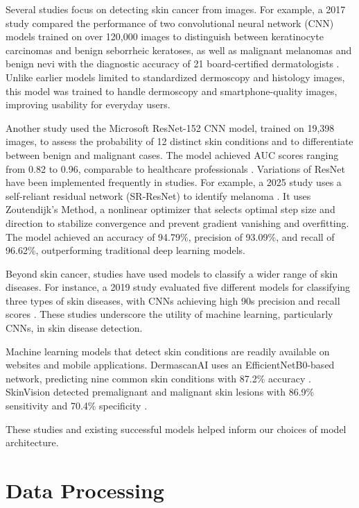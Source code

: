 \documentclass{article} %
\begin{document}
Several studies focus on detecting skin cancer from images. For example, a 2017 study compared the performance of two convolutional neural network (CNN) models trained on over 120,000 images to distinguish between keratinocyte carcinomas and benign seborrheic keratoses, as well as malignant melanomas and benign nevi with the diagnostic accuracy of 21 board-certified dermatologists \citep{esteva2017dermatologist}. Unlike earlier models limited to standardized dermoscopy and histology images, this model was trained to handle dermoscopy and smartphone-quality images, improving usability for everyday users.

Another study used the Microsoft ResNet-152 CNN model, trained on 19,398 images, to assess the probability of 12 distinct skin conditions and to differentiate between benign and malignant cases. The model achieved AUC scores ranging from 0.82 to 0.96, comparable to healthcare professionals \citep{han2018classification}. Variations of ResNet have been implemented frequently in studies. For example, a 2025 study uses a self-reliant residual network (SR-ResNet) to identify melanoma \citep{radhika2025self}. It uses Zoutendijk's Method, a nonlinear optimizer that selects optimal step size and direction to stabilize convergence and prevent gradient vanishing and overfitting. The model achieved an accuracy of 94.79\%, precision of 93.09\%, and recall of 96.62\%, outperforming traditional deep learning models.

Beyond skin cancer, studies have used models to classify a wider range of skin diseases. For instance, a 2019 study evaluated five different models for classifying three types of skin diseases, with CNNs achieving high 90s precision and recall scores \citep{bhadula2019machine}. These studies underscore the utility of machine learning, particularly CNNs, in skin disease detection.

Machine learning models that detect skin conditions are readily available on websites and mobile applications. DermascanAI uses an EfficientNetB0-based network, predicting nine common skin conditions with 87.2\% accuracy \citep{vadivelraju2025dermascan}. SkinVision detected premalignant and malignant skin lesions with 86.9\% sensitivity and 70.4\% specificity \citep{sangers2022validation}.

These studies and existing successful models helped inform our choices of model architecture.

\section{Data Processing}
\end{document}
